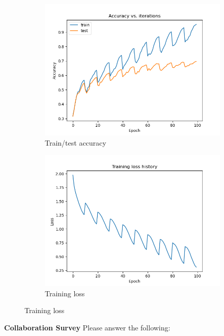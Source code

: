 \documentclass[11pt,addpoints,answers]{exam}
\begin{document}
\begin{figure}[H]
    \centering
    \begin{subfigure}[b]{0.32\linewidth}
        \includegraphics[width=\linewidth]{acc_out.png}
        \caption{Train/test accuracy}
    \end{subfigure}
    \begin{subfigure}[b]{0.32\linewidth}
        \includegraphics[width=\linewidth]{loss_out.png}
        \caption{Training loss}
    \end{subfigure}
\end{figure}

\clearpage

\textbf{Collaboration Survey} Please answer the following:
\end{document}
